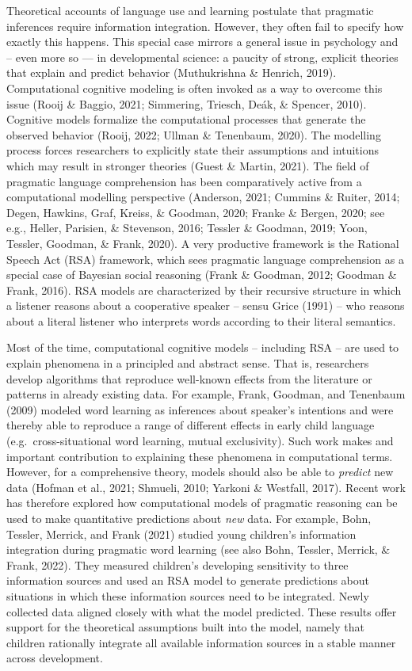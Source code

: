 \documentclass[
  man,floatsintext]{apa6}
\begin{document}
Theoretical accounts of language use and learning postulate that pragmatic inferences require information integration. However, they often fail to specify how exactly this happens. This special case mirrors a general issue in psychology and -- even more so --- in developmental science: a paucity of strong, explicit theories that explain and predict behavior (Muthukrishna \& Henrich, 2019). Computational cognitive modeling is often invoked as a way to overcome this issue (Rooij \& Baggio, 2021; Simmering, Triesch, Deák, \& Spencer, 2010). Cognitive models formalize the computational processes that generate the observed behavior (Rooij, 2022; Ullman \& Tenenbaum, 2020). The modelling process forces researchers to explicitly state their assumptions and intuitions which may result in stronger theories (Guest \& Martin, 2021). The field of pragmatic language comprehension has been comparatively active from a computational modelling perspective (Anderson, 2021; Cummins \& Ruiter, 2014; Degen, Hawkins, Graf, Kreiss, \& Goodman, 2020; Franke \& Bergen, 2020; see e.g., Heller, Parisien, \& Stevenson, 2016; Tessler \& Goodman, 2019; Yoon, Tessler, Goodman, \& Frank, 2020). A very productive framework is the Rational Speech Act (RSA) framework, which sees pragmatic language comprehension as a special case of Bayesian social reasoning (Frank \& Goodman, 2012; Goodman \& Frank, 2016). RSA models are characterized by their recursive structure in which a listener reasons about a cooperative speaker -- sensu Grice (1991) -- who reasons about a literal listener who interprets words according to their literal semantics.

Most of the time, computational cognitive models -- including RSA -- are used to explain phenomena in a principled and abstract sense. That is, researchers develop algorithms that reproduce well-known effects from the literature or patterns in already existing data. For example, Frank, Goodman, and Tenenbaum (2009) modeled word learning as inferences about speaker's intentions and were thereby able to reproduce a range of different effects in early child language (e.g.~cross-situational word learning, mutual exclusivity). Such work makes and important contribution to explaining these phenomena in computational terms. However, for a comprehensive theory, models should also be able to \emph{predict} new data (Hofman et al., 2021; Shmueli, 2010; Yarkoni \& Westfall, 2017). Recent work has therefore explored how computational models of pragmatic reasoning can be used to make quantitative predictions about \emph{new} data. For example, Bohn, Tessler, Merrick, and Frank (2021) studied young children's information integration during pragmatic word learning (see also Bohn, Tessler, Merrick, \& Frank, 2022). They measured children's developing sensitivity to three information sources and used an RSA model to generate predictions about situations in which these information sources need to be integrated. Newly collected data aligned closely with what the model predicted. These results offer support for the theoretical assumptions built into the model, namely that children rationally integrate all available information sources in a stable manner across development.
\end{document}
